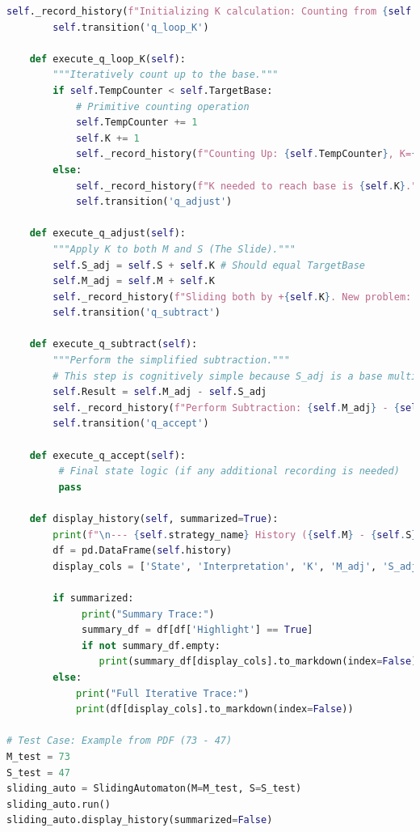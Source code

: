 \documentclass[11pt]{article}
\begin{document}
\begin{lstlisting}[language=Python]
        self._record_history(f"Initializing K calculation: Counting from {self.S} to {self.TargetBase}.")
        self.transition('q_loop_K')

    def execute_q_loop_K(self):
        """Iteratively count up to the base."""
        if self.TempCounter < self.TargetBase:
            # Primitive counting operation
            self.TempCounter += 1
            self.K += 1
            self._record_history(f"Counting Up: {self.TempCounter}, K={self.K}")
        else:
            self._record_history(f"K needed to reach base is {self.K}.", highlight=True)
            self.transition('q_adjust')

    def execute_q_adjust(self):
        """Apply K to both M and S (The Slide)."""
        self.S_adj = self.S + self.K # Should equal TargetBase
        self.M_adj = self.M + self.K
        self._record_history(f"Sliding both by +{self.K}. New problem: {self.M_adj} - {self.S_adj}.", highlight=True)
        self.transition('q_subtract')

    def execute_q_subtract(self):
        """Perform the simplified subtraction."""
        # This step is cognitively simple because S_adj is a base multiple.
        self.Result = self.M_adj - self.S_adj
        self._record_history(f"Perform Subtraction: {self.M_adj} - {self.S_adj} = {self.Result}.", highlight=True)
        self.transition('q_accept')

    def execute_q_accept(self):
         # Final state logic (if any additional recording is needed)
         pass

    def display_history(self, summarized=True):
        print(f"\n--- {self.strategy_name} History ({self.M} - {self.S}) ---")
        df = pd.DataFrame(self.history)
        display_cols = ['State', 'Interpretation', 'K', 'M_adj', 'S_adj']

        if summarized:
             print("Summary Trace:")
             summary_df = df[df['Highlight'] == True]
             if not summary_df.empty:
                print(summary_df[display_cols].to_markdown(index=False))
        else:
            print("Full Iterative Trace:")
            print(df[display_cols].to_markdown(index=False))

# Test Case: Example from PDF (73 - 47)
M_test = 73
S_test = 47
sliding_auto = SlidingAutomaton(M=M_test, S=S_test)
sliding_auto.run()
sliding_auto.display_history(summarized=False)
\end{lstlisting}
\end{document}
